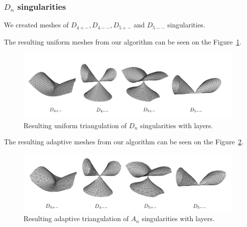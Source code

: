     \clearpage

    \subsubsection*{$D_{n}$ singularities}
    We created meshes of $D_{4+-}, D_{4--}, D_{5+-}$ and $D_{5--}$ singularities.

    The resulting uniform meshes from our algorithm can be seen on the 
    Figure~\ref{img:62}.
    \begin{figure}[h!]
        \centerline{\includegraphics[scale=0.5]{images/img62}}
        \caption[Resulting uniform triangulation of $D_{n}$ singularities]
        {Resulting uniform triangulation of $D_{n}$ singularities with layers.}
        \label{img:62}
    \end{figure}

    The resulting adaptive meshes from our algorithm can be seen on the 
    Figure~\ref{img:66}.
    \begin{figure}[h!]
        \centerline{\includegraphics[scale=0.5]{images/img66}}
        \caption[Resulting adaptive triangulation of $D_{n}$ singularities]
        {Resulting adaptive triangulation of $A_{n}$ singularities with layers.}
        \label{img:66}
    \end{figure}

